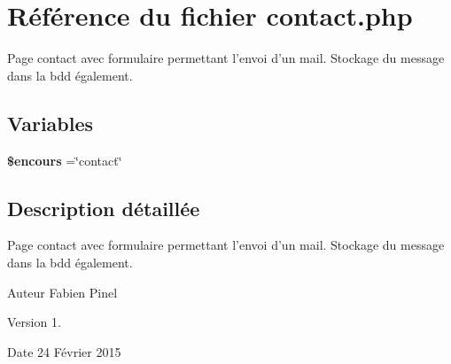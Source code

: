 \hypertarget{contact_8php}{\section{Référence du fichier contact.\-php}
\label{contact_8php}
}


Page contact avec formulaire permettant l'envoi d'un mail. Stockage du message dans la bdd également.  


\subsection*{Variables}
\begin{DoxyCompactItemize}
\item 
\hypertarget{contact_8php_af7b0e56292699e6983c24fbbf70ce08d}{{\bfseries \$encours} =\char`\"{}contact\char`\"{}}\label{contact_8php_af7b0e56292699e6983c24fbbf70ce08d}

\end{DoxyCompactItemize}


\subsection{Description détaillée}
Page contact avec formulaire permettant l'envoi d'un mail. Stockage du message dans la bdd également. \begin{DoxyAuthor}{Auteur}
Fabien Pinel 
\end{DoxyAuthor}
\begin{DoxyVersion}{Version}
1. 
\end{DoxyVersion}
\begin{DoxyDate}{Date}
24 Février 2015 
\end{DoxyDate}
